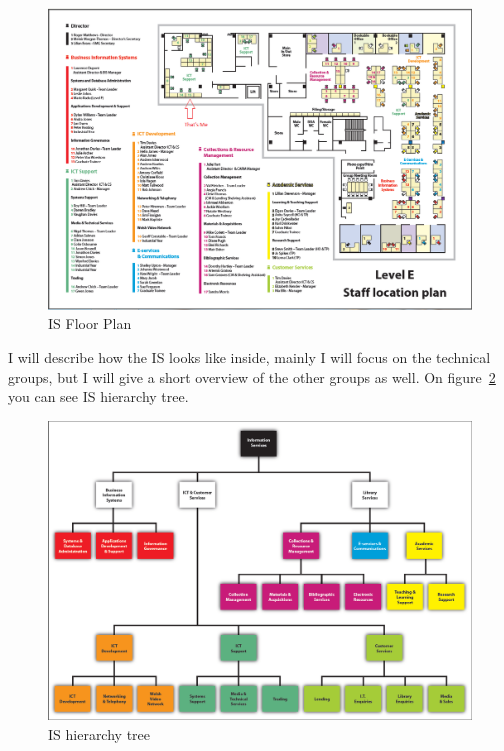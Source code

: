 \documentclass[10pt,a4paper,headinclude=true]{report}
\begin{document}
\begin{figure}[H]
\centering
\centerline{\includegraphics[scale=0.55]{./isfloorplan}}
\caption{IS Floor Plan \cite{ISFloor}}
\label{fig:isfloorplan}
\end{figure}

I will describe how the IS looks like inside, mainly I will focus on the technical groups, but I will give a short overview of the other groups as well. On figure~\ref{fig:i-s-hierarchy-tree-march-2012} you can see IS hierarchy tree.

\begin{figure}[H]
\centering
\centerline{\includegraphics[scale=0.55]{./i-s-hierarchy-tree-march-2012}}
\caption{IS hierarchy tree}
\label{fig:i-s-hierarchy-tree-march-2012}
\end{figure}
\end{document}
